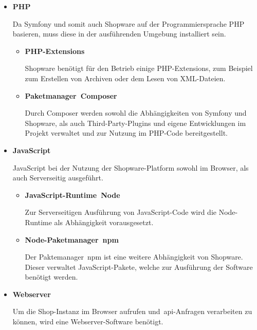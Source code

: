 \begin{itemize}
    \item {
        \textbf{PHP}\par
        Da Symfony und somit auch Shopware auf der Programmiersprache PHP basieren, muss diese in der ausführenden
        Umgebung installiert sein.

        \begin{itemize}
            \item {
                \textbf{PHP-Extensions}\par
                Shopware benötigt für den Betrieb einige PHP-Extensions, zum Beispiel zum Erstellen von Archiven
                oder dem Lesen von XML-Dateien.
            }

            \item {
                \textbf{Paketmanager\ \glqq Composer\grqq}\par
                Durch Composer werden sowohl die Abhängigkeiten von Symfony und Shopware, als auch Third-Party-Plugins
                und eigene Entwicklungen im Projekt verwaltet und zur Nutzung im PHP-Code bereitgestellt.
            }
        \end{itemize}
    }

    \item {
        \textbf{JavaScript}\par
        JavaScript bei der Nutzung der Shopware-Platform sowohl im Browser, als auch Serverseitig ausgeführt.

        \begin{itemize}
            \item {
                \textbf{JavaScript-Runtime\ \glqq Node\grqq}\par
                Zur Serverseitigen Ausführung von JavaScript-Code wird die Node-Runtime als Abhängigkeit vorausgesetzt.
            }

            \item {
                \textbf{Node-Paketmanager\ \glqq\acrshort{npm}\grqq}\par
                Der Paktemanager\ \acrshort{npm} ist eine weitere Abhängigkeit von Shopware.
                Dieser verwaltet JavaScript-Pakete, welche zur Ausführung der Software benötigt werden.
            }
        \end{itemize}
    }

    \clearpage

    \item {
        \textbf{Webserver}\par
        Um die Shop-Instanz im Browser aufrufen und\ \acrshort{api}-Anfragen verarbeiten zu können, wird eine
        Webserver-Software benötigt.
    }


\end{itemize}

